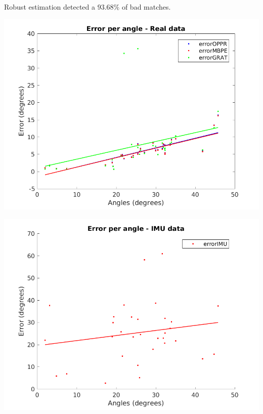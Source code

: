 Robust estimation detected a $ 93.68 \%$ of bad matches.

\begin{minipage}{0.5\textwidth}
	\centering
	\includegraphics[width=\textwidth]{images/sim/r2angle.png}
	\label{cha5:sec1:r2angle}
\end{minipage}
\begin{minipage}{0.5\textwidth}
	\centering
	\includegraphics[width=\textwidth]{images/sim/r2angleimu.png}
	\label{cha5:sec1:r2angleimu}
\end{minipage}\\

